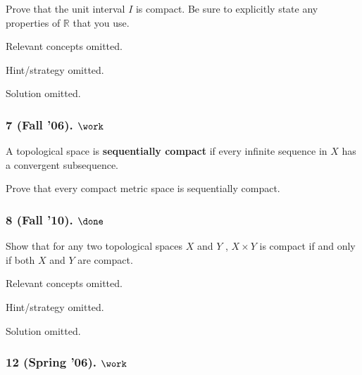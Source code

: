 \begin{problem}[Fall 2005]

Prove that the unit interval \(I\) is compact. Be sure to explicitly
state any properties of \({\mathbb{R}}\) that you use.

\end{problem}

Relevant concepts omitted.

Hint/strategy omitted.

Solution omitted.

\hypertarget{fall-06.-work}{%
\subsubsection{\texorpdfstring{7 (Fall '06).
\(\work\)}{7 (Fall '06). \textbackslash work}}\label{fall-06.-work}}

\begin{problem}[Fall 2006, 7]

A topological space is \textbf{sequentially compact} if every infinite
sequence in \(X\) has a convergent subsequence.

Prove that every compact metric space is sequentially compact.

\end{problem}

\hypertarget{fall-10.-done}{%
\subsubsection{\texorpdfstring{8 (Fall '10).
\(\done\)}{8 (Fall '10). \textbackslash done}}\label{fall-10.-done}}

\begin{problem}[Fall 2010, 8]

Show that for any two topological spaces \(X\) and \(Y\) ,
\(X \times Y\) is compact if and only if both \(X\) and \(Y\) are
compact.

\end{problem}

Relevant concepts omitted.

Hint/strategy omitted.

Solution omitted.

\hypertarget{spring-06.-work}{%
\subsubsection{\texorpdfstring{12 (Spring '06).
\(\work\)}{12 (Spring '06). \textbackslash work}}\label{spring-06.-work}}

